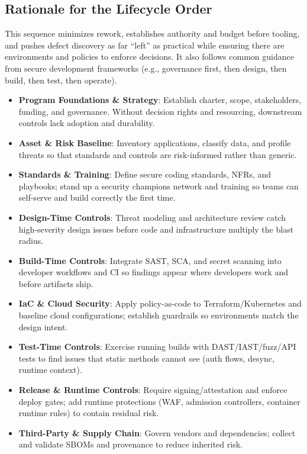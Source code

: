 \documentclass[11pt,a4paper]{article}
\begin{document}
\subsection*{Rationale for the Lifecycle Order}
This sequence minimizes rework, establishes authority and budget before tooling, and pushes defect discovery as far ``left'' as practical while ensuring there are environments and policies to enforce decisions. It also follows common guidance from secure development frameworks (e.g., governance first, then design, then build, then test, then operate).

\begin{itemize}
  \item \textbf{Program Foundations \& Strategy}: Establish charter, scope, stakeholders, funding, and governance. Without decision rights and resourcing, downstream controls lack adoption and durability.
  \item \textbf{Asset \& Risk Baseline}: Inventory applications, classify data, and profile threats so that standards and controls are risk-informed rather than generic.
  \item \textbf{Standards \& Training}: Define secure coding standards, NFRs, and playbooks; stand up a security champions network and training so teams can self-serve and build correctly the first time.
  \item \textbf{Design-Time Controls}: Threat modeling and architecture review catch high-severity design issues before code and infrastructure multiply the blast radius.
  \item \textbf{Build-Time Controls}: Integrate SAST, SCA, and secret scanning into developer workflows and CI so findings appear where developers work and before artifacts ship.
  \item \textbf{IaC \& Cloud Security}: Apply policy-as-code to Terraform/Kubernetes and baseline cloud configurations; establish guardrails so environments match the design intent.
  \item \textbf{Test-Time Controls}: Exercise running builds with DAST/IAST/fuzz/API tests to find issues that static methods cannot see (auth flows, desync, runtime context).
  \item \textbf{Release \& Runtime Controls}: Require signing/attestation and enforce deploy gates; add runtime protections (WAF, admission controllers, container runtime rules) to contain residual risk.
  \item \textbf{Third-Party \& Supply Chain}: Govern vendors and dependencies; collect and validate SBOMs and provenance to reduce inherited risk.

\end{itemize}
\end{document}
